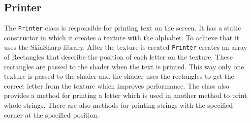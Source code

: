 \subsection{Printer}

The \texttt{Printer} class is responsible for printing text on the screen.
It has a static constructor in which it creates a texture with the alphabet.
To achieve that it uses the SkiaSharp library.
After the texture is created \texttt{Printer} creates an array of Rectangles that describe the position of each letter on the texture.
These rectangles are passed to the shader when the text is printed.
This way only one texture is passed to the shader and the shader uses the rectangles to get the correct letter from the texture which improves performance.
The class also provides a method for printing a letter which is used in another method to print whole strings.
There are also methods for printing strings with the specified corner at the specified position.